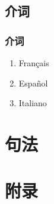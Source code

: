 \documentclass[UTF8,a4paper,titlepage,10pt]{report}
\begin{document}
\chapter{介词}
\label{sec:org9d66688}

\section{介词}
\label{sec:org9362d7d}

\begin{enumerate}
\item Français
\label{sec:org19dde34}

\item Español
\label{sec:orged6296d}

\item Italiano
\label{sec:org15e2627}
\end{enumerate}

\part{句法}
\label{sec:org09696bf}

\newpage
\part{附录}
\label{sec:org7d2cdf5}

\listoftables

\listoffigures

\printindex
\end{document}
